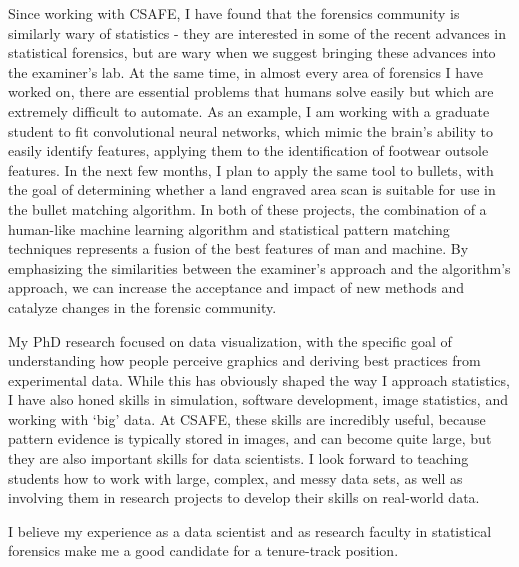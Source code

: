 \documentclass[12pt, letterpaper, sans]{moderncv}
\begin{document}
Since working with CSAFE, I have found that the forensics community is similarly wary of statistics - they are interested in some of the recent advances in statistical forensics, but are wary when we suggest bringing these advances into the examiner's lab. At the same time, in almost every area of forensics I have worked on, there are essential problems that humans solve easily but which are extremely difficult to automate. As an example, I am working with a graduate student to fit convolutional neural networks, which mimic the brain's ability to easily identify features, applying them to the identification of footwear outsole features. In the next few months, I plan to apply the same tool to bullets, with the goal of determining whether a land engraved area scan is suitable for use in the bullet matching algorithm. In both of these projects, the combination of a human-like machine learning algorithm and statistical pattern matching techniques represents a fusion of the best features of man and machine. By emphasizing the similarities between the examiner's approach and the algorithm's approach, we can increase the acceptance and impact of new methods and catalyze changes in the forensic community.

My PhD research focused on data visualization, with the specific goal of understanding how people perceive graphics and deriving best practices from experimental data. While this has obviously shaped the way I approach statistics, I have also honed skills in simulation, software development, image statistics, and working with `big' data. At CSAFE, these skills are incredibly useful, because pattern evidence is typically stored in images, and can become quite large, but they are also important skills for data scientists. I look forward to teaching students how to work with large, complex, and messy data sets, as well as involving them in research projects to develop their skills on real-world data. 

I believe my experience as a data scientist and as research faculty in statistical forensics make me a good candidate for a tenure-track position. 






\makeletterclosing
\end{document}
